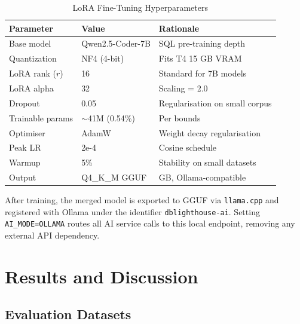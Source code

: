 \documentclass[12pt,a4paper]{report}
\begin{document}
\begin{table}[htbp]
\caption{LoRA Fine-Tuning Hyperparameters}
\label{tab:lora}
\centering
\begin{tabular}{>{\raggedright}p{3.5cm} >{\raggedright}p{2.5cm} >{\raggedright\arraybackslash}p{4cm}}
\toprule
\textbf{Parameter} & \textbf{Value} & \textbf{Rationale} \\
\midrule
Base model      & Qwen2.5-Coder-7B     & SQL pre-training depth \\
Quantization    & NF4 (4-bit)          & Fits T4 15 GB VRAM \\
LoRA rank ($r$) & 16                   & Standard for 7B models \\
LoRA alpha      & 32                   & Scaling = 2.0 \\
Dropout         & 0.05                 & Regularisation on small corpus \\
Trainable params & $\sim$41M (0.54\%) & Per \cite{hu2022lora} bounds \\
Optimiser       & AdamW                & Weight decay regularisation \\
Peak LR         & 2e-4                 & Cosine schedule \\
Warmup          & 5\%                  & Stability on small datasets \\
Output          & Q4\_K\_M GGUF       & 4.6 GB, Ollama-compatible \\
\bottomrule
\end{tabular}
\end{table}

After training, the merged model is exported to GGUF via \texttt{llama.cpp} and registered with Ollama under the identifier \texttt{dblighthouse-ai}. Setting \texttt{AI\_MODE=OLLAMA} routes all AI service calls to this local endpoint, removing any external API dependency.

\chapter{Results and Discussion}

\section{Evaluation Datasets}
\end{document}

